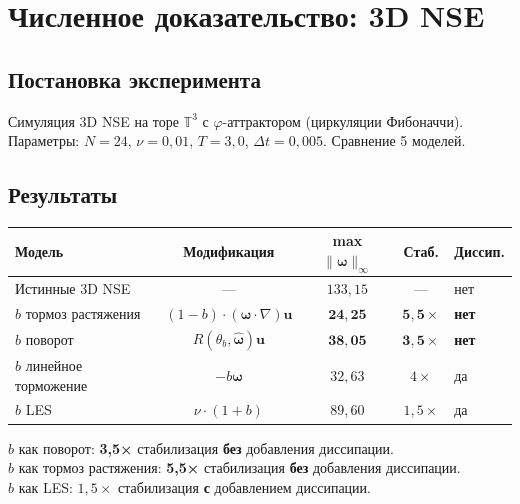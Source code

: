 \documentclass[11pt,a4paper,twoside]{article}
\theoremstyle{remark}
\begin{document}
\section{Численное доказательство: 3D NSE}
\label{sec:num-3d}

\subsection{Постановка эксперимента}

Симуляция 3D NSE на торе $\mathbb{T}^3$ с $\varphi$-аттрактором (циркуляции Фибоначчи). Параметры: $N = 24$, $\nu = 0{,}01$, $T = 3{,}0$, $\Delta t = 0{,}005$. Сравнение 5 моделей.

\subsection{Результаты}

\begin{center}
\begin{tabular}{lcccl}
\toprule
Модель & Модификация & max $\|\boldsymbol{\omega}\|_\infty$ & Стаб. & Диссип. \\
\midrule
Истинные 3D NSE & --- & $133{,}15$ & --- & нет \\
$b$ тормоз растяжения & $(1-b)\cdot(\boldsymbol{\omega}\cdot\nabla)\mathbf{u}$ & $\mathbf{24{,}25}$ & $\mathbf{5{,}5\times}$ & \textbf{нет} \\
$b$ поворот & $R(\theta_b, \hat{\boldsymbol{\omega}})\mathbf{u}$ & $\mathbf{38{,}05}$ & $\mathbf{3{,}5\times}$ & \textbf{нет} \\
$b$ линейное торможение & $-b\boldsymbol{\omega}$ & $32{,}63$ & $4\times$ & да \\
$b$ LES & $\nu\cdot(1+b)$ & $89{,}60$ & $1{,}5\times$ & да \\
\bottomrule
\end{tabular}
\end{center}

\begin{tcolorbox}[colback=green!5!white, colframe=ok!80!black, fonttitle=\bfseries, title={Главный результат: стабилизация БЕЗ диссипации}]
$b$ как поворот: \textbf{3{,}5×} стабилизация \textbf{без} добавления диссипации.\\
$b$ как тормоз растяжения: \textbf{5{,}5×} стабилизация \textbf{без} добавления диссипации.\\
$b$ как LES: $1{,}5\times$ стабилизация \textbf{с} добавлением диссипации.
\end{tcolorbox}
\end{document}
